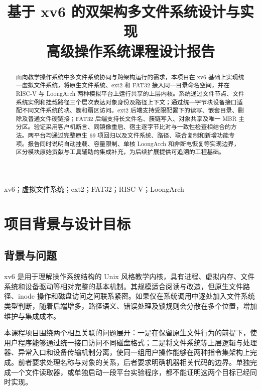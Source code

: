 \documentclass[conference]{IEEEtran}
\begin{document}
\title{基于 xv6 的双架构多文件系统设计与实现\\
\large 高级操作系统课程设计报告}
\author{
}
\maketitle

\begin{abstract}
面向教学操作系统中多文件系统协同与跨架构运行的需求，本项目在 xv6 基础上实现统一虚拟文件系统，将原生文件系统、ext2 和 FAT32 接入同一目录命名空间，并在 RISC-V 与 LoongArch 两种模拟平台上运行共享的上层内核。系统通过文件节点、文件系统实例和挂载路径三个层次表达对象身份及路径上下文；通过统一字节块设备接口适配不同文件系统的块、簇和扇区访问。ext2 后端支持受限配置下的读写、嵌套目录、删除及普通文件硬链接；FAT32 后端支持长文件名、簇链写入、对象共享及唯一 MBR 主分区。验证采用客户机断言、同镜像重启、宿主逐字节比对与一致性检查相结合的方法。两平台均通过完整原生 69 项回归以及文件系统、路径、联合复制和新增功能专项。报告同时说明自动挂载、容量限制、单核 LoongArch 和非断电恢复等实现边界，区分模块原始贡献与工具辅助的集成补充，为后续扩展提供可追溯的工程基础。
\end{abstract}
\begin{IEEEkeywords}
xv6；虚拟文件系统；ext2；FAT32；RISC-V；LoongArch
\end{IEEEkeywords}

\section{项目背景与设计目标}
\subsection{背景与问题}
xv6 是用于理解操作系统结构的 Unix 风格教学内核，具有进程、虚拟内存、文件系统和设备驱动等相对完整的基本机制。其规模适合阅读与改造，但原生文件路径、inode 操作和磁盘访问之间联系紧密。如果仅在系统调用中逐处加入文件系统类型判断，随着后端增多，路径语义、错误处理及锁规则会分散在多个位置，增加维护与集成成本。

本课程项目围绕两个相互关联的问题展开：一是在保留原生文件行为的前提下，使用户程序能够通过统一接口访问不同磁盘格式；二是将文件系统等上层逻辑与处理器、异常入口和设备传输机制分离，使同一组用户操作能够在两种指令集架构上完成。前者要求处理名称与对象的关系，后者要求明确机器相关代码的边界。单独完成一个文件读取器，或单独启动一段平台实验程序，都不能证明这两个目标已经同时实现。
\end{document}
